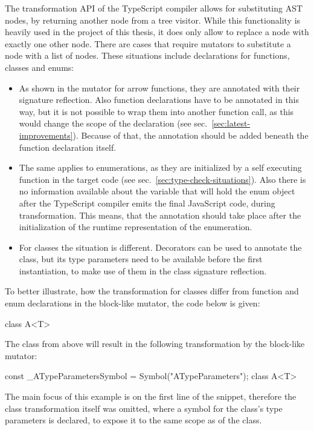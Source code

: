 The transformation API of the TypeScript compiler allows for substituting AST nodes, by returning another node from a tree visitor. While this functionality is heavily used in the project of this thesis, it does only allow to replace a node with exactly one other node. There are cases that require mutators to substitute a node with a list of nodes. These situations include declarations for functions, classes and enums:
\begin{itemize}
  \item As shown in the mutator for arrow functions, they are annotated with their signature reflection. Also function declarations have to be annotated in this way, but it is not possible to wrap them into another function call, as this would change the scope of the declaration (see sec.~\ref{sec:latest-improvements}). Because of that, the annotation should be added beneath the function declaration itself.
  \item The same applies to enumerations, as they are initialized by a self executing function in the target code (see sec.~\ref{sec:type-check-situations}). Also there is no information available about the variable that will hold the enum object after the TypeScript compiler emits the final JavaScript code, during transformation. This means, that the annotation should take place after the initialization of the runtime representation of the enumeration.
  \item For classes the situation is different. Decorators can be used to annotate the class, but its type parameters need to be available before the first instantiation, to make use of them in the class signature reflection.
\end{itemize}
To better illustrate, how the transformation for classes differ from function and enum declarations in the block-like mutator, the code below is given:
\begin{JsCode}[numbers=none]
class A<T> { }
\end{JsCode}
The class from above will result in the following transformation by the block-like mutator:
\begin{JsCode}[numbers=none]
const _ATypeParametersSymbol = Symbol("ATypeParameters");
class A<T> { }
\end{JsCode}
The main focus of this example is on the first line of the snippet, therefore the class transformation itself was omitted, where a symbol for the class's type parameters is declared, to expose it to the same scope as of the class.

